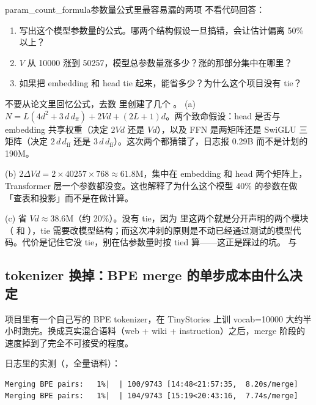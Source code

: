 \begin{checkpoint}{param_count_formula}{参数量公式里最容易漏的两项}
不看代码回答：
\begin{enumerate}[label=(\alph*)]
  \item 写出这个模型参数量的公式。哪两个结构假设一旦搞错，会让估计偏离 50\% 以上？
  \item $V$ 从 10000 涨到 50257，模型总参数量涨多少？涨的那部分集中在哪里？
  \item 如果把 embedding 和 head tie 起来，能省多少？为什么这个项目没有 tie？
\end{enumerate}
\hint 不要从论文里回忆公式，去数  里创建了几个 。
\ifshowanswers
\tcblower
\answer (a) $N = L(4d^{2}+3\,d\,d_{\mathrm{ff}}) + 2Vd + (2L+1)d$。两个致命假设：head 是否与 embedding 共享权重（决定 $2Vd$ 还是 $Vd$），以及 FFN 是两矩阵还是 SwiGLU 三矩阵（决定 $2\,d\,d_{\mathrm{ff}}$ 还是 $3\,d\,d_{\mathrm{ff}}$）。这次两个都猜错了，日志报 0.29B 而不是计划的 190M。

(b) $2\Delta V d = 2\times40257\times768 \approx 61.8$M，集中在 embedding 和 head 两个矩阵上，Transformer 层一个参数都没变。这也解释了为什么这个模型 40\% 的参数在做「查表和投影」而不是在做计算。

(c) 省 $Vd \approx 38.6$M（约 20\%）。没有 tie，因为  里这两个就是分开声明的两个模块（ 和 ），tie 需要改模型结构；而这次冲刺的原则是不动已经通过测试的模型代码。代价是记住它没 tie，别在估参数量时按 tied 算——这正是踩过的坑。
\whereincode {} 与 
\fi
\end{checkpoint}

\subsection{tokenizer 换掉：BPE merge 的单步成本由什么决定}
\label{subsec:tokenizer}

项目里有一个自己写的 BPE tokenizer，在 TinyStories 上训 vocab=10000 大约半小时跑完。换成真实混合语料（web + wiki + instruction）之后，merge 阶段的速度掉到了完全不可接受的程度。

日志里的实测（，全量语料）：

\begin{lstlisting}[style=hlrepl]
Merging BPE pairs:   1%|  | 100/9743 [14:48<21:57:35,  8.20s/merge]
Merging BPE pairs:   1%|  | 104/9743 [15:19<20:43:16,  7.74s/merge]
\end{lstlisting}

